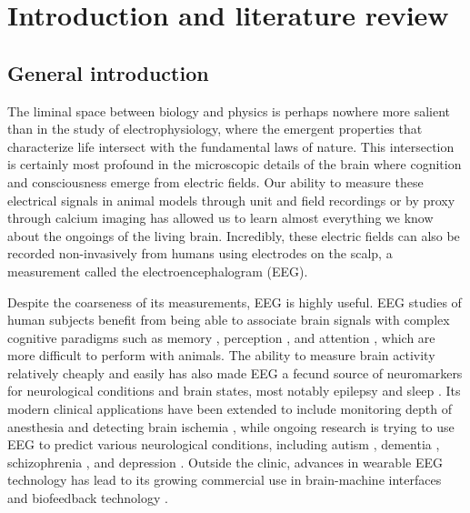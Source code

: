 \chapter{Introduction and literature review} \label{sec:intro}


\section{General introduction}

The liminal space between biology and physics is perhaps nowhere more salient than in the study of electrophysiology, where the emergent properties that characterize life intersect with the fundamental laws of nature. This intersection is certainly most profound in the microscopic details of the brain where cognition and consciousness emerge from electric fields. Our ability to measure these electrical signals in animal models through unit and field recordings or by proxy through calcium imaging has allowed us to learn almost everything we know about the ongoings of the living brain. Incredibly, these electric fields can also be recorded non-invasively from humans using electrodes on the scalp, a measurement called the electroencephalogram (EEG). 

Despite the coarseness of its measurements, EEG is highly useful. EEG studies of human subjects benefit from being able to associate brain signals with complex cognitive paradigms such as memory \cite{Osipova2006, Sauseng2009, Sauseng2010}, perception \cite{Rodriguez1999, Melloni2007,Fahrenfort2012}, and attention \cite{Hillyard1998, Makeig2002}, which are more difficult to perform with animals. The ability to measure brain activity relatively cheaply and easily has also made EEG a fecund source of neuromarkers for neurological conditions and brain states, most notably epilepsy \cite{Engel1984,Noachtar2009} and sleep \cite{Wolpert1969, Prerau2016}. Its modern clinical applications have been extended to include monitoring depth of anesthesia \cite{Michael2008} and detecting brain ischemia \cite{Meghdadi2021}, while ongoing research is trying to use EEG to predict various neurological conditions, including autism \cite{Bosl2018}, dementia \cite{Meghdadi2021}, schizophrenia \cite{Meghdadi2021}, and depression \cite{DeAguiarNeto2019}. Outside the clinic, advances in wearable EEG technology has lead to its growing commercial use in brain-machine interfaces \cite{Mahmood2021} and biofeedback technology \cite{Hunkin2021}. 

